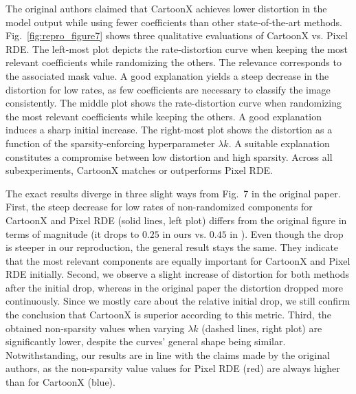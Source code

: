 The original authors claimed that CartoonX achieves lower distortion in the model output while using fewer coefficients than other state‐of‐the‐art methods.
Fig.~\ref{fig:repro_figure7} shows three qualitative evaluations of CartoonX vs. Pixel RDE.
The left-most plot depicts the rate-distortion curve when keeping the most relevant coefficients while randomizing the others. The relevance corresponds to the associated mask value.
A good explanation yields a steep decrease in the distortion for low rates, as few coefficients are necessary to classify the image consistently.
The middle plot shows the rate-distortion curve when randomizing the most relevant coefficients while keeping the others.
A good explanation induces a sharp initial increase.
The right-most plot shows the distortion as a function of the sparsity-enforcing hyperparameter $\lambda k$.
A suitable explanation constitutes a compromise between low distortion and high sparsity.
Across all subexperiments, CartoonX matches or outperforms Pixel RDE.

The exact results diverge in three slight ways from Fig.~7 in the original paper.
First, the steep decrease for low rates of non-randomized components for CartoonX and Pixel RDE (solid lines, left plot) differs from the original figure in terms of magnitude (it drops to $0.25$ in ours vs. $0.45$ in \cite{cartoonX}).
Even though the drop is steeper in our reproduction, the general result stays the same.
They indicate that the most relevant components are equally important for CartoonX and Pixel RDE initially. 
Second, we observe a slight increase of distortion for both methods after the initial drop, whereas in the original paper the distortion dropped more continuously.
Since we mostly care about the relative initial drop, we still confirm the conclusion that CartoonX is superior according to this metric.
Third, the obtained non-sparsity values when varying $\lambda k$ (dashed lines, right plot) are significantly lower, despite the curves' general shape being similar.
Notwithstanding, our results are in line with the claims made by the original authors, as the non-sparsity value values for Pixel RDE (red) are always higher than for CartoonX (blue).



